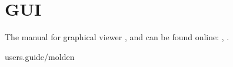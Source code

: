 
\chapter{GUI}

The manual for graphical viewer , and  can be found
online: , .

 {users.guide/molden}
